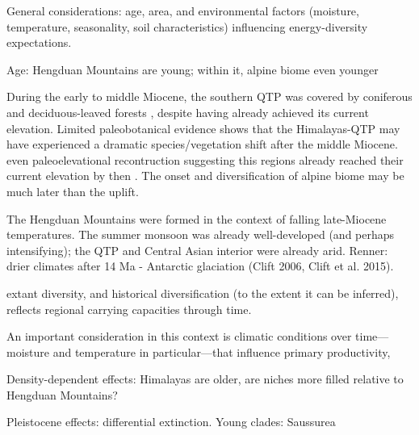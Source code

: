 General considerations: age, area, and environmental factors (moisture, temperature, seasonality, soil characteristics) influencing energy-diversity expectations.

Age: Hengduan Mountains are young; within it, alpine biome even younger

During the early to middle Miocene, the southern QTP was covered by coniferous and deciduous-leaved forests \citep{SunJ2014,LiH1976}, despite having already achieved its current elevation. Limited paleobotanical evidence shows that the Himalayas-QTP may have experienced a dramatic species/vegetation shift after the middle Miocene. even paleoelevational recontruction suggesting this regions already reached their current elevation by then \citep{Spicer2003}. The onset and diversification of alpine biome may be much later than the uplift.

The Hengduan Mountains were formed in the context of falling late-Miocene temperatures. The summer monsoon was already well-developed (and perhaps intensifying); the QTP and Central Asian interior were already arid. Renner: drier climates after 14 Ma - Antarctic glaciation (Clift 2006, Clift et al. 2015).



 extant diversity, and historical diversification (to the extent it can be inferred), reflects regional carrying capacities through time. 

An important consideration in this context is climatic conditions over time---moisture and temperature in particular---that influence primary productivity,  

Density-dependent effects: Himalayas are older, are niches more filled relative to Hengduan Mountains?

Pleistocene effects: differential extinction. Young clades: Saussurea






